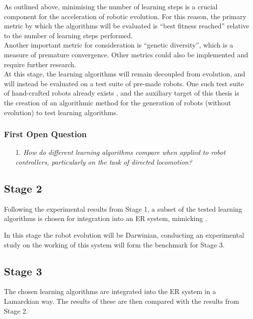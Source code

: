\documentclass{scrartcl}
\begin{document}
As outlined above, minimising the number of learning steps is a crucial component for the acceleration of robotic evolution.
For this reason, the primary metric by which the algorithms will be evaluated is ``best fitness reached'' relative to the number of learning steps performed.\\

Another important metric for consideration is ``genetic diversity'', which is a measure of premature convergence.
Other metrics could also be implemented and require further research. \\

At this stage, the learning algorithms will remain decoupled from evolution, and will instead be evaluated on a test suite of pre-made robots.
One such test suite of hand-crafted robots already exists \cite{Diggelen2022}, and the auxiliary target of this thesis is the creation of an algorithmic method for the generation of robots (without evolution) to test learning algorithms.

\subsubsection{First Open Question}

\begin{itemize}
    \item[1.] \textit{How do different learning algorithms compare when applied to robot controllers, particularly on the task of directed locomotion?}
\end{itemize}


\subsection{Stage 2}

Following the experimental results from Stage 1, a subset of the tested learning algorithms is chosen for integration into an ER system, mimicking \cite{Luo2022}.

In this stage the robot evolution will be Darwinian, conducting an experimental study on the working of this system will form the benchmark for Stage 3.

\subsection{Stage 3}

The chosen learning algorithms are integrated into the ER system in a Lamarckian way.
The results of these are then compared with the results from Stage 2. \\
\end{document}
